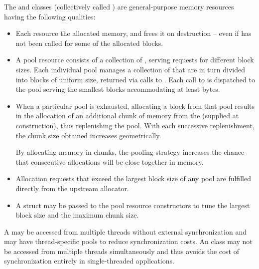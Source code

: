 \pnum
The  and
 classes
(collectively called )
are general-purpose memory resources having the following qualities:
\begin{itemize}
\item
Each resource  the allocated memory, and frees it on destruction --
even if  has not been called for some of the allocated blocks.
\item
A pool resource consists of a collection of ,
serving requests for different block sizes.
Each individual pool manages a collection of 
that are in turn divided into blocks of uniform size,
returned via calls to .
Each call to  is dispatched
to the pool serving the smallest blocks accommodating at least  bytes.
\item
When a particular pool is exhausted,
allocating a block from that pool results in the allocation
of an additional chunk of memory from the 
(supplied at construction), thus replenishing the pool.
With each successive replenishment,
the chunk size obtained increases geometrically.
\begin{note}
By allocating memory in chunks,
the pooling strategy increases the chance that consecutive allocations
will be close together in memory.\end{note}
\item
Allocation requests that exceed the largest block size of any pool
are fulfilled directly from the upstream allocator.
\item
A  struct may be passed to the pool resource constructors
to tune the largest block size and the maximum chunk size.
\end{itemize}

\pnum
A  may be accessed from multiple threads
without external synchronization
and may have thread-specific pools to reduce synchronization costs.
An  class may not be accessed
from multiple threads simultaneously
and thus avoids the cost of synchronization entirely
in single-threaded applications.


